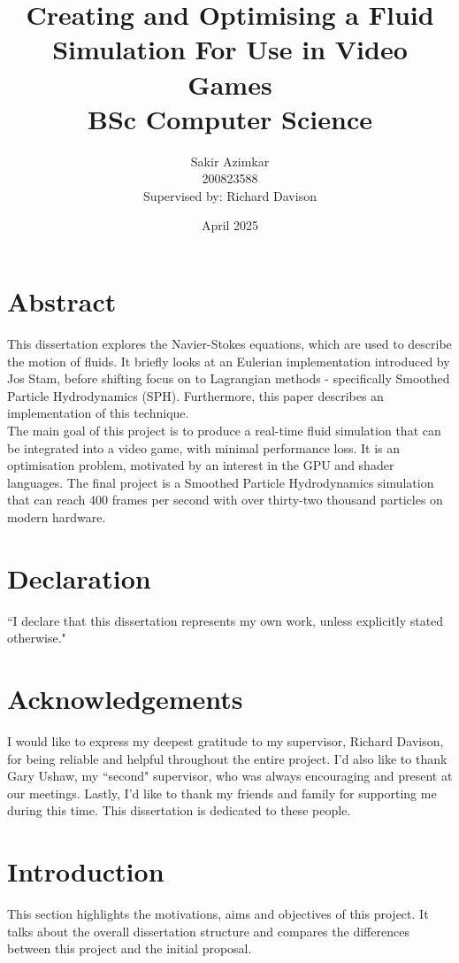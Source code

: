 \documentclass[12pt]{article}
\title
{
    {\Huge Creating and Optimising a Fluid Simulation For Use in Video Games} \\
    \vspace*{1cm}
    {\LARGE BSc Computer Science}
}
\author
{
    \vspace*{0.1cm}\huge Sakir Azimkar \\
    \vspace*{1cm}\huge 200823588 \\
    \large Supervised by: Richard Davison
}
\date{April 2025}
\begin{document}
    \maketitle
    \thispagestyle{empty}

    \newpage

    \section*{Abstract}
    This dissertation explores the Navier-Stokes equations, which are used to describe the motion of fluids. It briefly looks at an Eulerian implementation introduced by Jos Stam\cite{stam}, before shifting focus on to Lagrangian methods - specifically Smoothed Particle Hydrodynamics (SPH). Furthermore, this paper describes an implementation of this technique. \\ The main goal of this project is to produce a real-time fluid simulation that can be integrated into a video game, with minimal performance loss. It is an optimisation problem, motivated by an interest in the GPU and shader languages. The final project is a Smoothed Particle Hydrodynamics simulation that can reach 400 frames per second with over thirty-two thousand particles on modern hardware.
    
    \newpage

    \section*{Declaration} ``I declare that this dissertation represents my own work, unless explicitly stated otherwise."

    \newpage

    \section*{Acknowledgements}
    I would like to express my deepest gratitude to my supervisor, Richard Davison, for being reliable and helpful throughout the entire project. I'd also like to thank Gary Ushaw, my ``second" supervisor, who was always encouraging and present at our meetings. Lastly, I'd like to thank my friends and family for supporting me during this time. This dissertation is dedicated to these people.
    
    \newpage
    \tableofcontents
    \newpage
    \listoffigures
    \newpage

    \section{Introduction}
    \label{sec:introduction}
    This section highlights the motivations, aims and objectives of this project. It talks about the overall dissertation structure and compares the differences between this project and the initial proposal.
    
\end{document}
